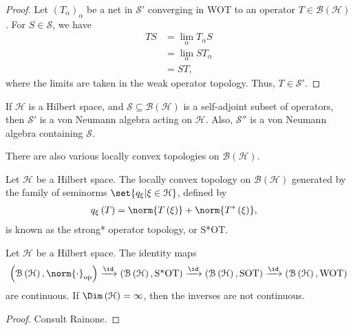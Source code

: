\documentclass[10pt]{mypackage}
\begin{document}
\begin{proof}
  Let $\left(T_{\alpha}\right)_{\alpha}$ be a net in $\mathcal{S}'$ converging in WOT to an operator $T\in \mathcal{B}\left(\mathcal{H}\right)$. For $S\in \mathcal{S}$, we have
  \begin{align*}
    TS &= \lim_{\alpha}T_{\alpha}S\\
       &= \lim_{\alpha}ST_{\alpha}\\
       &= ST,
  \end{align*}
  where the limits are taken in the weak operator topology. Thus, $T\in \mathcal{S}'$.
\end{proof}
\begin{corollary}
  If $\mathcal{H}$ is a Hilbert space, and $\mathcal{S}\subseteq \mathcal{B}\left(\mathcal{H}\right)$ is a self-adjoint subset of operators, then $\mathcal{S}'$ is a von Neumann algebra acting on $\mathcal{H}$. Also, $\mathcal{S}''$ is a von Neumann algebra containing $\mathcal{S}$.
\end{corollary}
There are also various locally convex topologies on $\mathcal{B}\left(\mathcal{H}\right)$.
\begin{definition}
  Let $\mathcal{H}$ be a Hilbert space. The locally convex topology on $\mathcal{B}\left(\mathcal{H}\right)$ generated by the family of seminorms $\set{q_{\xi} | \xi\in \mathcal{H}}$, defined by
  \begin{align*}
    q_{\xi}\left(T\right) &= \norm{T\left(\xi\right)} + \norm{T^{\ast}\left(\xi\right)},
  \end{align*}
  is known as the strong* operator topology, or S*OT.
\end{definition}
\begin{proposition}
  Let $\mathcal{H}$ be a Hilbert space. The identity maps
  \begin{align*}
    \left(\mathcal{B}\left(\mathcal{H}\right),\norm{\cdot}_{\text{op}}\right) \xrightarrow{\id}\left(\mathcal{B}\left(\mathcal{H}\right),\text{S*OT}\right)\xrightarrow{\id}\left(\mathcal{B}\left(\mathcal{H}\right),\text{SOT}\right)\xrightarrow{\id}\left(\mathcal{B}\left(\mathcal{H}\right),\text{WOT}\right)
  \end{align*}
  are continuous. If $\Dim\left(\mathcal{H}\right)=\infty$, then the inverses are not continuous.
\end{proposition}
\begin{proof}
  Consult Rainone.
\end{proof}
\end{document}
